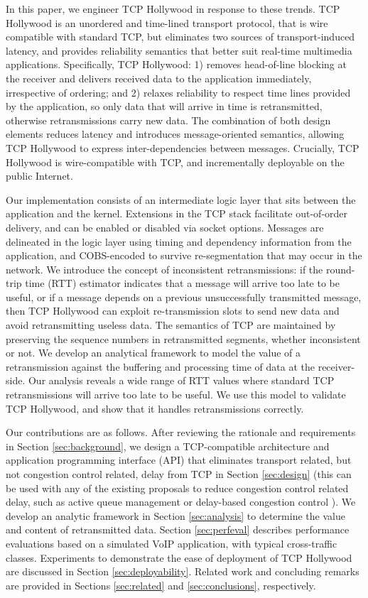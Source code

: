 In this paper, we engineer TCP Hollywood in response to these trends.
TCP Hollywood is an unordered and time-lined transport protocol, that is wire
compatible with standard TCP, but eliminates two sources of transport-induced
latency, and provides reliability semantics that better suit real-time
multimedia applications.  Specifically, TCP Hollywood: 1) removes
head-of-line blocking at the receiver and delivers received data to the
application immediately, irrespective of ordering; and 2) relaxes
reliability to respect time lines provided by the application, so only
data that will arrive in time is retransmitted, otherwise retransmissions
carry new data. The combination of both design elements reduces latency
and introduces message-oriented semantics, allowing TCP Hollywood to
express inter-dependencies between messages. Crucially, TCP Hollywood is
wire-compatible with TCP, and incrementally deployable on the public
Internet.

Our implementation consists of an intermediate logic layer that sits
between the application and the kernel. Extensions in the TCP stack
facilitate out-of-order delivery, and can be enabled or disabled via
socket options. Messages are delineated in the logic layer using timing
and dependency information from the application, and COBS-encoded
\cite{chesire:1997:COBS} to survive re-segmentation that may occur in the
network. We introduce the concept of inconsistent retransmissions: if the
round-trip time (RTT) estimator indicates that a message will arrive too late to be useful,
or if a message depends on a previous unsuccessfully transmitted message,
then TCP Hollywood can exploit re-transmission slots to send new data and
avoid retransmitting useless data. The semantics of TCP are maintained by
preserving the sequence numbers in retransmitted segments, whether
inconsistent or not.
We develop an analytical framework to model the value of a retransmission
against the buffering and processing time of data at the receiver-side.
Our analysis reveals a wide range of RTT values where standard TCP
retransmissions will arrive too late to be useful. We use this model to
validate TCP Hollywood, and show that it handles retransmissions correctly.

Our contributions are as follows.  After reviewing the rationale and
requirements in Section \ref{sec:background}, we design a TCP-compatible
architecture and application programming interface (API) that eliminates
transport related, but not congestion control related, delay from TCP in
Section \ref{sec:design} (this can be used with any of the existing
proposals to reduce congestion control related delay, such as active
queue management \cite{nichols:2012:codel,khademi:2014:new-aqm} or
delay-based congestion control \cite{jin:2004:fast-tcp,brakmo:1994:tcp-vegas}).
We develop an analytic framework in Section
\ref{sec:analysis} to determine the value and content of retransmitted
data. Section \ref{sec:perfeval} describes performance evaluations based on 
a simulated VoIP application, with typical cross-traffic classes. 
Experiments to demonstrate the ease of deployment of TCP Hollywood are
discussed in Section \ref{sec:deployability}. Related work and concluding
remarks are provided in Sections \ref{sec:related} and
\ref{sec:conclusions}, respectively.

